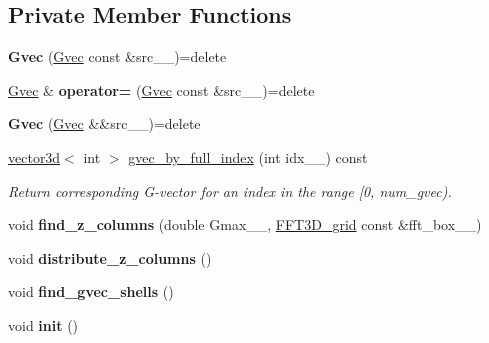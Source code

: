 \subsection*{Private Member Functions}
\begin{DoxyCompactItemize}
\item 
\hypertarget{classsddk_1_1_gvec_af88a7c6d2c6948818a75b292afbbbadf}{}{\bfseries Gvec} (\hyperlink{classsddk_1_1_gvec}{Gvec} const \&src\+\_\+\+\_\+)=delete\label{classsddk_1_1_gvec_af88a7c6d2c6948818a75b292afbbbadf}

\item 
\hypertarget{classsddk_1_1_gvec_a3b0e820b6bf61de840ae72d48def0a91}{}\hyperlink{classsddk_1_1_gvec}{Gvec} \& {\bfseries operator=} (\hyperlink{classsddk_1_1_gvec}{Gvec} const \&src\+\_\+\+\_\+)=delete\label{classsddk_1_1_gvec_a3b0e820b6bf61de840ae72d48def0a91}

\item 
\hypertarget{classsddk_1_1_gvec_ad467e64e22b92ab548d43ab705ddf378}{}{\bfseries Gvec} (\hyperlink{classsddk_1_1_gvec}{Gvec} \&\&src\+\_\+\+\_\+)=delete\label{classsddk_1_1_gvec_ad467e64e22b92ab548d43ab705ddf378}

\item 
\hyperlink{classgeometry3d_1_1vector3d}{vector3d}$<$ int $>$ \hyperlink{classsddk_1_1_gvec_a15b26e9d2a8c7eeef909dc15eaeedd5d}{gvec\+\_\+by\+\_\+full\+\_\+index} (int idx\+\_\+\+\_\+) const 
\begin{DoxyCompactList}\small\item\em Return corresponding G-\/vector for an index in the range \mbox{[}0, num\+\_\+gvec). \end{DoxyCompactList}\item 
\hypertarget{classsddk_1_1_gvec_a05b943a6f44e627d205bb81d23c997df}{}void {\bfseries find\+\_\+z\+\_\+columns} (double Gmax\+\_\+\+\_\+, \hyperlink{classsddk_1_1_f_f_t3_d__grid}{F\+F\+T3\+D\+\_\+grid} const \&fft\+\_\+box\+\_\+\+\_\+)\label{classsddk_1_1_gvec_a05b943a6f44e627d205bb81d23c997df}

\item 
\hypertarget{classsddk_1_1_gvec_a774a4e2d37d31b7eec8e36c05fb98093}{}void {\bfseries distribute\+\_\+z\+\_\+columns} ()\label{classsddk_1_1_gvec_a774a4e2d37d31b7eec8e36c05fb98093}

\item 
\hypertarget{classsddk_1_1_gvec_a77c68e942ce1b8328171b022dccc74bf}{}void {\bfseries find\+\_\+gvec\+\_\+shells} ()\label{classsddk_1_1_gvec_a77c68e942ce1b8328171b022dccc74bf}

\item 
\hypertarget{classsddk_1_1_gvec_a142b9ff82ee6debb8f618dfebb022bfc}{}void {\bfseries init} ()\label{classsddk_1_1_gvec_a142b9ff82ee6debb8f618dfebb022bfc}

\end{DoxyCompactItemize}
